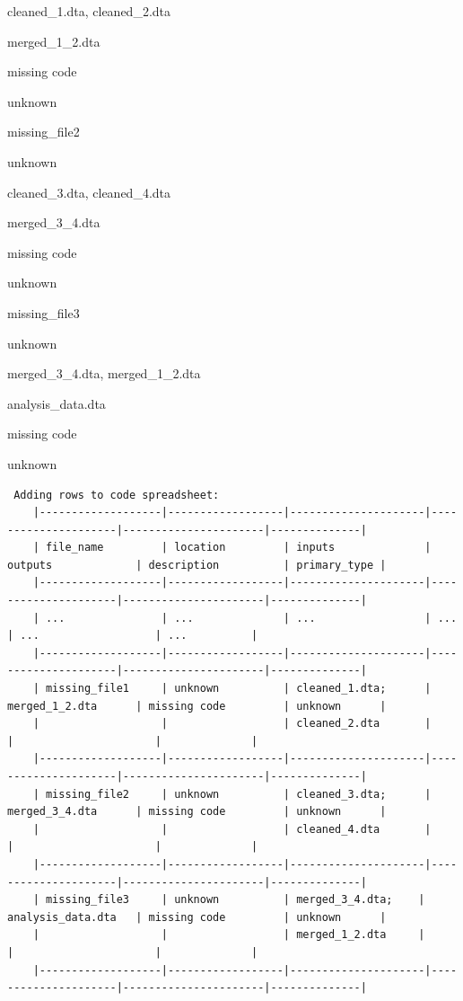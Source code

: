 \documentclass[]{book}
\begin{document}
cleaned\_1.dta, cleaned\_2.dta

merged\_1\_2.dta

missing code

unknown

missing\_file2

unknown

cleaned\_3.dta, cleaned\_4.dta

merged\_3\_4.dta

missing code

unknown

missing\_file3

unknown

merged\_3\_4.dta, merged\_1\_2.dta

analysis\_data.dta

missing code

unknown

\begin{verbatim}
 Adding rows to code spreadsheet:
    |-------------------|------------------|---------------------|---------------------|----------------------|--------------|
    | file_name         | location         | inputs              | outputs             | description          | primary_type |
    |-------------------|------------------|---------------------|---------------------|----------------------|--------------|
    | ...               | ...              | ...                 | ...                 | ...                  | ...          |
    |-------------------|------------------|---------------------|---------------------|----------------------|--------------|
    | missing_file1     | unknown          | cleaned_1.dta;      | merged_1_2.dta      | missing code         | unknown      |
    |                   |                  | cleaned_2.dta       |                     |                      |              |
    |-------------------|------------------|---------------------|---------------------|----------------------|--------------|
    | missing_file2     | unknown          | cleaned_3.dta;      | merged_3_4.dta      | missing code         | unknown      |
    |                   |                  | cleaned_4.dta       |                     |                      |              |                  
    |-------------------|------------------|---------------------|---------------------|----------------------|--------------|
    | missing_file3     | unknown          | merged_3_4.dta;    | analysis_data.dta   | missing code         | unknown      |
    |                   |                  | merged_1_2.dta     |                     |                      |              |                  
    |-------------------|------------------|---------------------|---------------------|----------------------|--------------|
\end{verbatim}
\end{document}
